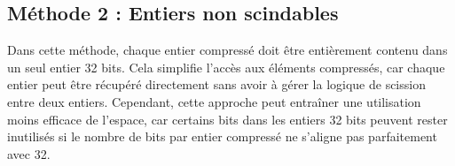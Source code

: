 \documentclass{rapportClass} %
\begin{document}
\subsection{Méthode 2 : Entiers non scindables}
Dans cette méthode, chaque entier compressé doit être entièrement contenu dans un seul entier 32 bits.
Cela simplifie l'accès aux éléments compressés, car chaque entier peut être récupéré directement sans
avoir à gérer la logique de scission entre deux entiers. Cependant, cette approche peut entraîner une utilisation moins efficace de l'espace,
car certains bits dans les entiers 32 bits peuvent rester inutilisés si le nombre de bits par entier compressé ne s'aligne pas parfaitement avec 32.
\begin{figure}[h!]
    \centering
\end{figure}
\end{document}
